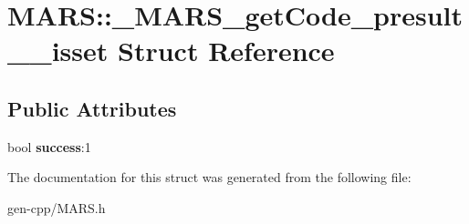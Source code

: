 \hypertarget{structMARS_1_1__MARS__getCode__presult____isset}{}\section{M\+A\+RS\+:\+:\+\_\+\+M\+A\+R\+S\+\_\+get\+Code\+\_\+presult\+\_\+\+\_\+isset Struct Reference}
\label{structMARS_1_1__MARS__getCode__presult____isset}
\subsection*{Public Attributes}
\begin{DoxyCompactItemize}
\item 
\mbox{\label{structMARS_1_1__MARS__getCode__presult____isset_aec06a4ce2106b778bb7c2ea5af877287}} 
bool {\bfseries success}\+:1
\end{DoxyCompactItemize}


The documentation for this struct was generated from the following file\+:\begin{DoxyCompactItemize}
\item 
gen-\/cpp/M\+A\+R\+S.\+h\end{DoxyCompactItemize}
